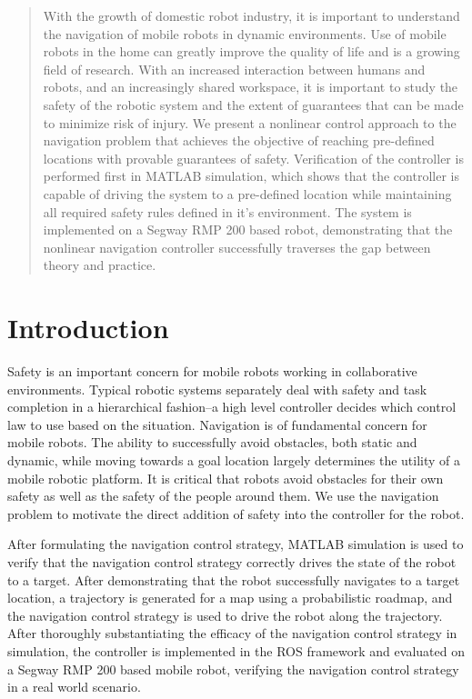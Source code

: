 \documentclass[conference]{IEEEtran}
\begin{document}
\begin{abstract}
With the growth of domestic robot industry, it is important to understand the navigation of mobile robots in dynamic environments. Use of mobile robots in the home can greatly improve the quality of life and is a growing field of research. With an increased interaction between humans and robots, and an increasingly shared workspace, it is important to study the safety of the robotic system and the extent of guarantees that can be made to minimize risk of injury. We present a nonlinear control approach to the navigation problem that achieves the objective of reaching pre-defined locations with provable guarantees of safety. Verification of the controller is performed first in MATLAB simulation, which shows that the controller is capable of driving the system to a pre-defined location while maintaining all required safety rules defined in it's environment. The system is implemented on a Segway RMP 200 based robot, demonstrating that the nonlinear navigation controller successfully traverses the gap between theory and practice. 
\end{abstract}

\IEEEpeerreviewmaketitle

\section{Introduction}
Safety is an important concern for mobile robots working in collaborative environments. Typical robotic systems separately deal with safety and task completion in a hierarchical fashion--a high level controller decides which control law to use based on the situation. Navigation is of fundamental concern for mobile robots. The ability to successfully avoid obstacles, both static and dynamic, while moving towards a goal location largely determines the utility of a mobile robotic platform. It is critical that robots avoid obstacles for their own safety as well as the safety of the people around them. We use the navigation problem to motivate the direct addition of safety into the controller for the robot.

After formulating the navigation control strategy, MATLAB simulation is used to verify that the navigation control strategy correctly drives the state of the robot to a target. After demonstrating that the robot successfully navigates to a target location, a trajectory is generated for a map using a probabilistic roadmap, and the navigation control strategy is used to drive the robot along the trajectory. After thoroughly substantiating the efficacy of the navigation control strategy in simulation, the controller is implemented in the ROS framework and evaluated on a Segway RMP 200 based mobile robot, verifying the navigation control strategy in a real world scenario.
\end{document}
